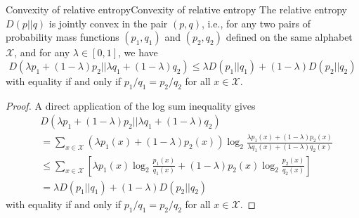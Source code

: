 \documentclass[../main.tex]{subfiles}
\begin{document}
\begin{theorem}{Convexity of relative entropy}{Convexity of relative entropy}
  The relative entropy $D(p||q)$ is jointly convex in the pair $(p,q)$, i.e., for any two pairs of probability mass functions $(p_1,q_1)$ and $(p_2,q_2)$ defined on the same alphabet $\mathcal{X}$, and for any $\lambda \in [0,1]$, we have
  \begin{equation}
    D(\lambda p_1 + (1-\lambda) p_2 || \lambda q_1 + (1-\lambda) q_2) \leq \lambda D(p_1||q_1) + (1-\lambda) D(p_2||q_2)
  \end{equation}
  with equality if and only if $p_1/q_1 = p_2/q_2$ for all $x \in \mathcal{X}$.
\end{theorem}
\begin{proof}
  A direct application of the log sum inequality gives
  \begin{equation*}
    \begin{aligned}
      &D(\lambda p_1 + (1-\lambda) p_2 || \lambda q_1 + (1-\lambda) q_2)\\
      &= \sum_{x \in \mathcal{X}} (\lambda p_1(x) + (1-\lambda) p_2(x)) \log_2 \frac{\lambda p_1(x) + (1-\lambda) p_2(x)}{\lambda q_1(x) + (1-\lambda) q_2(x)}\\
      &\leq \sum_{x \in \mathcal{X}} \left[\lambda p_1(x) \log_2 \frac{p_1(x)}{q_1(x)} + (1-\lambda) p_2(x) \log_2 \frac{p_2(x)}{q_2(x)}\right]\\
      &= \lambda D(p_1||q_1) + (1-\lambda) D(p_2||q_2)
    \end{aligned}
  \end{equation*}
  with equality if and only if $p_1/q_1 = p_2/q_2$ for all $x \in \mathcal{X}$.
\end{proof}
\end{document}
